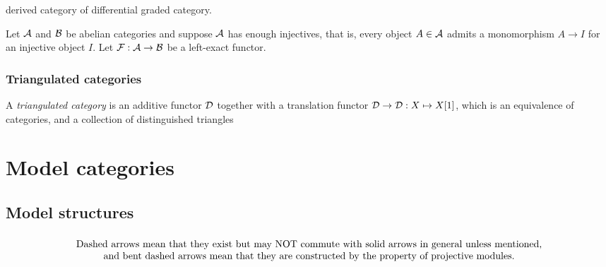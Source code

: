 \documentclass{../../large}
\begin{document}
derived category of differential graded category.



\begin{prb}
Let $\mathcal{A}$ and $\mathcal{B}$ be abelian categories and suppose $\mathcal{A}$ has enough injectives, that is, every object $A\in\mathcal{A}$ admits a monomorphism $A\to I$ for an injective object $I$.
Let $\mathcal{F}:\mathcal{A}\to\mathcal{B}$ be a left-exact functor.

\end{prb}



\section{Triangulated categories}


\begin{prb}
A \emph{triangulated category} is an additive functor $\mathcal{D}$ together with a translation functor $\mathcal{D}\to\mathcal{D}:X\mapsto X[1]$, which is an equivalence of categories, and a collection of distinguished triangles 

\end{prb}




\chapter{}









\part{Model categories}

\chapter{Model structures}

\section{}

\[\tab{Dashed arrows mean that they exist but may NOT commute with solid arrows in general unless mentioned,\\ and bent dashed arrows mean that they are constructed by the property of projective modules.}\]
\end{document}
